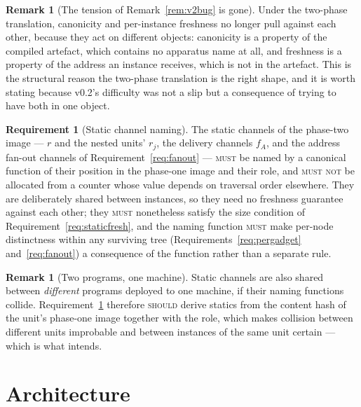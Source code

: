 \documentclass[11pt,a4paper]{article}
\newcommand{\MUST}{\textsc{must}}
\newcommand{\MUSTNOT}{\textsc{must not}}
\newcommand{\SHOULD}{\textsc{should}}
\theoremstyle{definition}
\newtheorem{requirement}[definition]{Requirement}
\newtheorem{remark}[definition]{Remark}
\theoremstyle{plain}
\begin{document}
\begin{remark}[The tension of Remark~\ref{rem:v2bug} is gone]
Under the two-phase translation, canonicity and per-instance freshness no
longer pull against each other, because they act on different objects:
canonicity is a property of the compiled artefact, which contains no apparatus
name at all, and freshness is a property of the address an instance receives,
which is not in the artefact. This is the structural reason the two-phase
translation is the right shape, and it is worth stating because v0.2's
difficulty was not a slip but a consequence of trying to have both in one
object.
\end{remark}

\begin{requirement}[Static channel naming]\label{req:statics}
The static channels of the phase-two image --- $r$ and the nested units'
$r_{j}$, the delivery channels $f_{A}$, and the address fan-out channels of
Requirement~\ref{req:fanout} --- \MUST{} be named by a canonical function of
their position in the phase-one image and their role, and \MUSTNOT{} be
allocated from a counter whose value depends on traversal order elsewhere.
They are deliberately shared between instances, so they need no freshness
guarantee against each other; they \MUST{} nonetheless satisfy the size
condition of Requirement~\ref{req:staticfresh}, and the naming function
\MUST{} make per-node distinctness within any surviving tree
(Requirements~\ref{req:pergadget} and~\ref{req:fanout}) a consequence of the
function rather than a separate rule.
\end{requirement}

\begin{remark}[Two programs, one machine]
Static channels are also shared between \emph{different} programs deployed to
one machine, if their naming functions collide. Requirement~\ref{req:statics}
therefore \SHOULD{} derive statics from the content hash of the unit's
phase-one image together with the role, which makes collision between
different units improbable and between instances of the same unit certain ---
which is what \cite[Rem.~6.10]{draft3} intends.
\end{remark}

\section{Architecture}\label{sec:arch}
\end{document}
